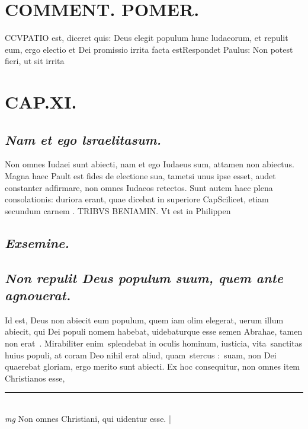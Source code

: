 \documentclass{article}
\begin{document}
\begin{pages}
\section*{COMMENT. POMER.  }\pstart CCVPATIO est, diceret quis: Deus elegit populum hunc ludaeorum, et repulit eum, ergo electio et Dei promissio irrita facta estRespondet Paulus: Non potest fieri, ut sit irrita\pend
\endnumbering\beginnumbering\section{CAP.XI.}
{}
\subsection*{\textit{Nam et ego lsraelitasum. }}\pstart Non omnes Iudaei sunt abiecti, nam et ego Iudaeus sum, attamen non abiectus. Magna haec Pault est fides de electione sua, tametsi unus ipse esset, audet constanter adfirmare, non omnes Iudaeos retectos. Sunt autem haec plena consolationis: duriora erant, quae dicebat in superiore Cap\pend\pstart Scilicet, etiam secundum carnem . TRIBVS BENIAMIN. Vt est in Philippen\pend
{}
{}
\subsection*{\textit{Exsemine. }}
{}
\subsection*{\textit{Non repulit Deus populum suum, quem ante agnouerat. }}\pstart Id est, Deus non abiecit eum populum, quem iam olim elegerat, uerum illum abiecit, qui Dei populi nomem habebat, uidebaturque esse semen Abrahae, tamen non erat . Mirabiliter enim splendebat in oculis hominum, iusticia, vita sanctitas huius populi, at coram Deo nihil erat aliud, quam stercus : suam, non Dei quaerebat gloriam, ergo merito sunt abiecti. Ex hoc consequitur, non omnes item Christianos esse,  \pend
\vspace{0.5cm}\noindent
\vspace{0.2cm}\rule{1cm}{0.2pt}\\ 
\hspace{0.2cm}\textit{mg}
\footnotesize Non omnes Christiani, qui uidentur esse.  
\normalsize| 

\end{pages}
\end{document}
